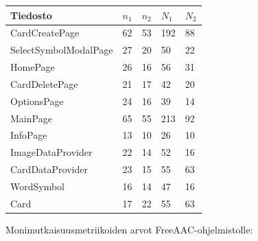 \documentclass[utf8]{gradu3}
\begin{document}
\begin{center}
    \begin{tabular}{| l | l | l | l | l |}
    \hline
    \textbf{Tiedosto} & \textbf{$n_1$} & \textbf{$n_2$} & \textbf{$N_1$} & \textbf{$N_2$} \\ \hline
    CardCreatePage & 62 & 53 & 192 & 88 \\ \hline
    SelectSymbolModalPage & 27 & 20 & 50 & 22 \\ \hline
    HomePage & 26 & 16 & 56 & 31 \\ \hline
    CardDeletePage & 21 & 17 & 42 & 20 \\ \hline
    OptionsPage & 24 & 16 & 39 & 14 \\ \hline
    MainPage & 65 & 55 & 213 & 92 \\ \hline
    InfoPage & 13 & 10 & 26 & 10 \\ \hline
    ImageDataProvider & 22 & 14 & 52 & 16 \\ \hline
    CardDataProvider & 23 & 15 & 55 & 63 \\ \hline
    WordSymbol & 16 & 14 & 47 & 16 \\ \hline
    Card & 17 & 22 & 55 & 63 \\ \hline
    \end{tabular}
\end{center}

Monimutkaisuusmetriikoiden arvot FreeAAC-ohjelmistolle:
\end{document}
